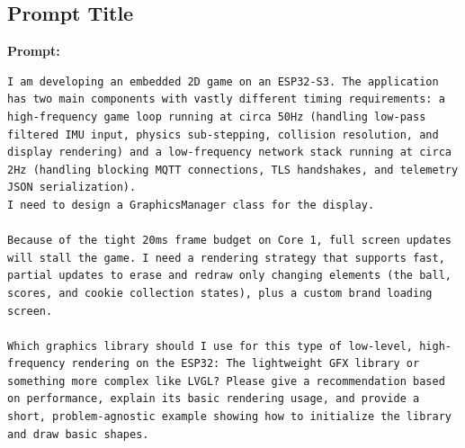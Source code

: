 \subsection{Prompt Title}

\textbf{Prompt:}
\begin{lstlisting}[language={}, breaklines=true]
I am developing an embedded 2D game on an ESP32-S3. The application has two main components with vastly different timing requirements: a high-frequency game loop running at circa 50Hz (handling low-pass filtered IMU input, physics sub-stepping, collision resolution, and display rendering) and a low-frequency network stack running at circa 2Hz (handling blocking MQTT connections, TLS handshakes, and telemetry JSON serialization).
I need to design a GraphicsManager class for the display.

Because of the tight 20ms frame budget on Core 1, full screen updates will stall the game. I need a rendering strategy that supports fast, partial updates to erase and redraw only changing elements (the ball, scores, and cookie collection states), plus a custom brand loading screen.

Which graphics library should I use for this type of low-level, high-frequency rendering on the ESP32: The lightweight GFX library or something more complex like LVGL? Please give a recommendation based on performance, explain its basic rendering usage, and provide a short, problem-agnostic example showing how to initialize the library and draw basic shapes.
\end{lstlisting}


